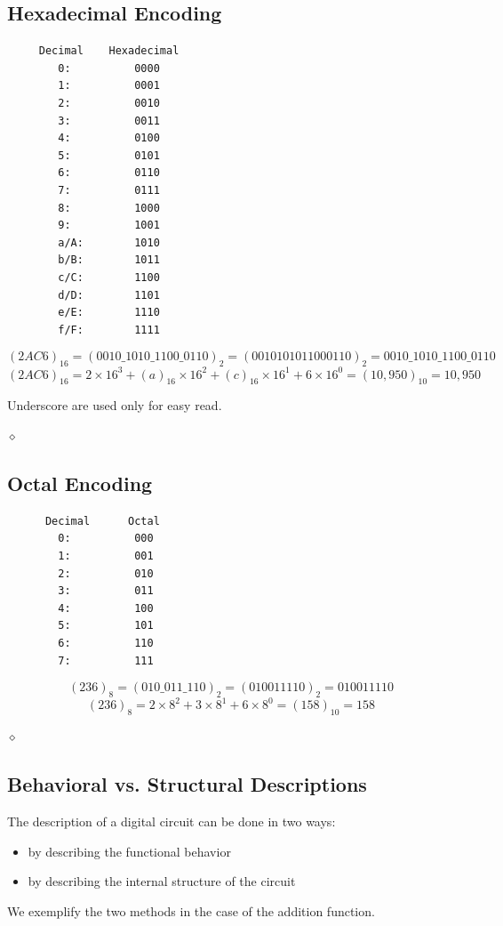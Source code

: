 \subsection{Hexadecimal Encoding}

\begin{verbatim}
     Decimal    Hexadecimal
        0:          0000
        1:          0001
        2:          0010
        3:          0011
        4:          0100
        5:          0101
        6:          0110
        7:          0111
        8:          1000
        9:          1001
        a/A:        1010
        b/B:        1011
        c/C:        1100
        d/D:        1101
        e/E:        1110
        f/F:        1111
\end{verbatim}

\begin{exemplu}
$$(2AC6)_{16} = (0010\_1010\_1100\_0110)_2 = (0010101011000110)_2 = 0010\_1010\_1100\_0110$$
$$(2AC6)_{16} = 2 \times 16^3 + (a)_{16} \times 16^2 + (c)_{16} \times 16^1 + 6 \times 16^0 = (10,950)_{10} = 10,950$$

Underscore are used only for easy read.

$\diamond$
\end{exemplu}

\subsection{Octal Encoding}

\begin{verbatim}
      Decimal      Octal
        0:          000
        1:          001
        2:          010
        3:          011
        4:          100
        5:          101
        6:          110
        7:          111
\end{verbatim}

\begin{exemplu}
$$(236)_8 = (010\_011\_110)_2 = (010011110)_2 =  010011110$$
$$(236)_8 = 2 \times 8^2 + 3 \times 8^1 + 6 \times 8^0 = (158)_{10} = 158$$

$\diamond$
\end{exemplu}

\subsection{Behavioral vs. Structural Descriptions}

The description of a digital circuit can be done in two ways:
\begin{itemize}
\item  by describing the functional behavior
\item  by describing the internal structure of the circuit
\end{itemize}
We exemplify the two methods in the case of the addition function.


